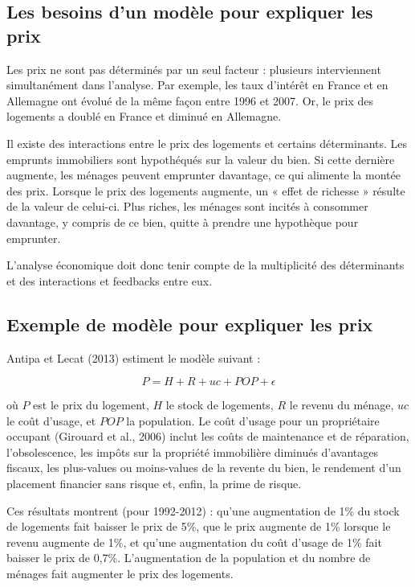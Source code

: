 \documentclass[a4paper, 12pt]{report}
\begin{document}
\subsection{Les besoins d'un modèle pour expliquer les prix}

Les prix ne sont pas déterminés par un seul facteur : plusieurs interviennent simultanément dans l’analyse. Par exemple, les taux d’intérêt en France et en Allemagne ont évolué de la même façon entre 1996 et 2007. Or, le prix des logements a doublé en France et diminué en Allemagne. 

Il existe des interactions entre le prix des logements et certains déterminants. Les emprunts immobiliers sont hypothéqués sur la valeur du bien. Si cette dernière augmente, les ménages peuvent emprunter davantage, ce qui alimente la montée des prix. Lorsque le prix des logements augmente, un « effet de richesse » résulte de la valeur de celui-ci. Plus riches, les ménages sont incités à consommer davantage, y compris de ce bien, quitte à prendre une hypothèque pour emprunter. 

L’analyse économique doit donc tenir compte de la multiplicité des déterminants et des interactions et feedbacks entre eux.

\subsection{Exemple de modèle pour expliquer les prix}

Antipa et Lecat (2013) estiment le modèle suivant : 

\[ 
P=H+R+uc+POP+\epsilon
\]

où \( P \) est le prix du logement, \( H \) le stock de logements, \( R \) le revenu du ménage, \( uc \) le coût d’usage, et \( POP \) la population. Le coût d’usage pour un propriétaire occupant (Girouard et al., 2006) inclut les coûts de maintenance et de réparation, l’obsolescence, les impôts sur la propriété immobilière diminués d’avantages fiscaux, les plus-values ou moins-values de la revente du bien, le rendement d’un placement financier sans risque et, enfin, la prime de risque. 

Ces résultats montrent (pour 1992-2012) : qu’une augmentation de 1\% du stock de logements fait baisser le prix de 5\%, que le prix augmente de 1\% lorsque le revenu augmente de 1\%, et qu’une augmentation du coût d’usage de 1\% fait baisser le prix de 0,7\%. L’augmentation de la population et du nombre de ménages fait augmenter le prix des logements.
\end{document}
